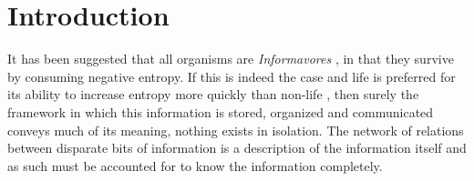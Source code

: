 

\graphicspath{{1_introduction/figures/}} %





\setcounter{page}{1}
\chapter{Introduction}

It has been suggested that all organisms are \emph{Informavores} \citep{MARGALEF1996141}, in that they survive by consuming negative entropy. If this is indeed the case and life is preferred for its ability to increase entropy more quickly than non-life \citep{england2013statistical}, then surely the framework in which this information is stored, organized and communicated conveys much of its meaning, \ie nothing exists in isolation. The network of relations between disparate bits of information is a description of the information itself and as such must be accounted for to know the information completely. %

